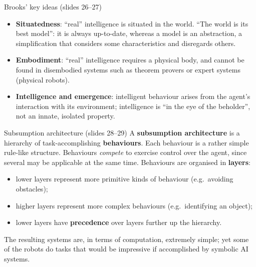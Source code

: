\begin{nbfact}{Brooks' key ideas (slides 26--27)}
\begin{itemize}[nosep]
  \item \textbf{Situatedness}: ``real'' intelligence is situated in the world. ``The world
        is its best model'': it is always up-to-date, whereas a model is an abstraction, a
        simplification that considers some characteristics and disregards others.
  \item \textbf{Embodiment}: ``real'' intelligence requires a physical body, and cannot be
        found in disembodied systems such as theorem provers or expert systems (physical
        robots).
  \item \textbf{Intelligence and emergence}: intelligent behaviour arises from the agent's
        interaction with its environment; intelligence is ``in the eye of the beholder'',
        not an innate, isolated property.
\end{itemize}
\end{nbfact}

\begin{nbdef}{Subsumption architecture (slides 28--29)}
A \textbf{subsumption architecture} is a hierarchy of task-accomplishing
\textbf{behaviours}. Each behaviour is a rather simple rule-like structure. Behaviours
\emph{compete} to exercise control over the agent, since several may be applicable at the
same time. Behaviours are organised in \textbf{layers}:
\begin{itemize}[nosep]
  \item lower layers represent more primitive kinds of behaviour (e.g.\ avoiding obstacles);
  \item higher layers represent more complex behaviours (e.g.\ identifying an object);
  \item lower layers have \textbf{precedence} over layers further up the hierarchy.
\end{itemize}
The resulting systems are, in terms of computation, extremely simple; yet some of the
robots do tasks that would be impressive if accomplished by symbolic AI systems.
\end{nbdef}

